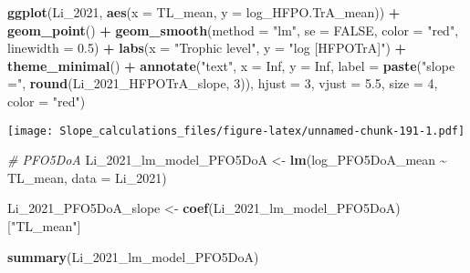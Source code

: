 \documentclass[
]{article}
\newenvironment{Shaded}{\begin{snugshade}}{\end{snugshade}}
\newcommand{\AttributeTok}[1]{\textcolor[rgb]{0.13,0.29,0.53}{#1}}
\newcommand{\CommentTok}[1]{\textcolor[rgb]{0.56,0.35,0.01}{\textit{#1}}}
\newcommand{\ConstantTok}[1]{\textcolor[rgb]{0.56,0.35,0.01}{#1}}
\newcommand{\DecValTok}[1]{\textcolor[rgb]{0.00,0.00,0.81}{#1}}
\newcommand{\FloatTok}[1]{\textcolor[rgb]{0.00,0.00,0.81}{#1}}
\newcommand{\FunctionTok}[1]{\textcolor[rgb]{0.13,0.29,0.53}{\textbf{#1}}}
\newcommand{\NormalTok}[1]{#1}
\newcommand{\OtherTok}[1]{\textcolor[rgb]{0.56,0.35,0.01}{#1}}
\newcommand{\SpecialCharTok}[1]{\textcolor[rgb]{0.81,0.36,0.00}{\textbf{#1}}}
\newcommand{\StringTok}[1]{\textcolor[rgb]{0.31,0.60,0.02}{#1}}
\begin{document}
\begin{Shaded}
\begin{Highlighting}[]
\FunctionTok{ggplot}\NormalTok{(Li\_2021, }\FunctionTok{aes}\NormalTok{(}\AttributeTok{x =}\NormalTok{ TL\_mean, }\AttributeTok{y =}\NormalTok{ log\_HFPO.TrA\_mean)) }\SpecialCharTok{+}
  \FunctionTok{geom\_point}\NormalTok{() }\SpecialCharTok{+}
  \FunctionTok{geom\_smooth}\NormalTok{(}\AttributeTok{method =} \StringTok{"lm"}\NormalTok{, }\AttributeTok{se =} \ConstantTok{FALSE}\NormalTok{, }\AttributeTok{color =} \StringTok{"red"}\NormalTok{, }\AttributeTok{linewidth =} \FloatTok{0.5}\NormalTok{) }\SpecialCharTok{+}
  \FunctionTok{labs}\NormalTok{(}\AttributeTok{x =} \StringTok{"Trophic level"}\NormalTok{,}
       \AttributeTok{y =} \StringTok{"log [HFPOTrA]"}\NormalTok{) }\SpecialCharTok{+}
  \FunctionTok{theme\_minimal}\NormalTok{() }\SpecialCharTok{+}
  \FunctionTok{annotate}\NormalTok{(}\StringTok{"text"}\NormalTok{, }\AttributeTok{x =} \ConstantTok{Inf}\NormalTok{, }\AttributeTok{y =} \ConstantTok{Inf}\NormalTok{, }\AttributeTok{label =} \FunctionTok{paste}\NormalTok{(}\StringTok{"slope ="}\NormalTok{, }\FunctionTok{round}\NormalTok{(Li\_2021\_HFPOTrA\_slope, }\DecValTok{3}\NormalTok{)), }
           \AttributeTok{hjust =} \DecValTok{3}\NormalTok{, }\AttributeTok{vjust =} \FloatTok{5.5}\NormalTok{, }\AttributeTok{size =} \DecValTok{4}\NormalTok{, }\AttributeTok{color =} \StringTok{"red"}\NormalTok{)}
\end{Highlighting}
\end{Shaded}

\texttt{[image: Slope\_calculations\_files/figure-latex/unnamed-chunk-191-1.pdf]}

\begin{Shaded}
\begin{Highlighting}[]
\CommentTok{\# PFO5DoA}
\NormalTok{Li\_2021\_lm\_model\_PFO5DoA }\OtherTok{\textless{}{-}} \FunctionTok{lm}\NormalTok{(log\_PFO5DoA\_mean }\SpecialCharTok{\textasciitilde{}}\NormalTok{ TL\_mean,}
                                    \AttributeTok{data =}\NormalTok{ Li\_2021)}

\NormalTok{Li\_2021\_PFO5DoA\_slope }\OtherTok{\textless{}{-}} \FunctionTok{coef}\NormalTok{(Li\_2021\_lm\_model\_PFO5DoA)[}\StringTok{"TL\_mean"}\NormalTok{]}

\FunctionTok{summary}\NormalTok{(Li\_2021\_lm\_model\_PFO5DoA)}
\end{Highlighting}
\end{Shaded}
\end{document}
